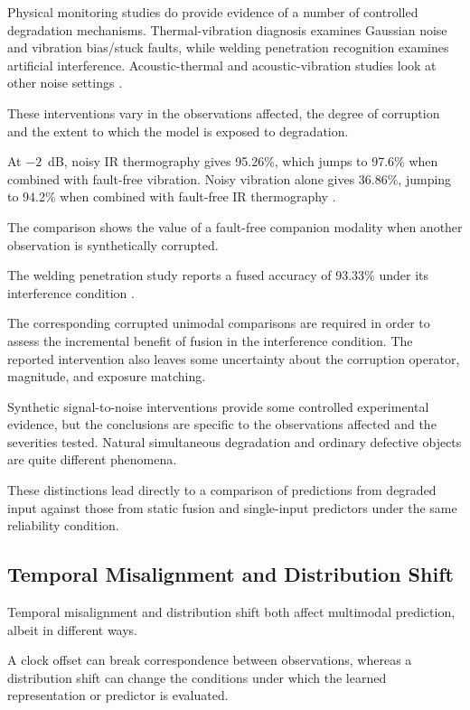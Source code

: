 Physical monitoring studies do provide evidence of a number of controlled degradation mechanisms.
Thermal-vibration diagnosis examines Gaussian noise and vibration bias/stuck faults, while welding
penetration recognition examines artificial interference. Acoustic-thermal and acoustic-vibration
studies look at other noise settings
\parencite{huo_multisensor_2022,hua_anti-interference_2026,ying_trustworthy_2025,huang_rolling_2026}.

These interventions vary in the observations affected, the degree of corruption and the extent to
which the model is exposed to degradation.

At $-2$~dB, noisy IR thermography gives 95.26\%, which jumps to 97.6\% when combined with fault-free
vibration. Noisy vibration alone gives 36.86\%, jumping to 94.2\% when combined with fault-free IR
thermography \parencite[Table~VIII]{huo_multisensor_2022}.

The comparison shows the value of a fault-free companion modality when another observation is
synthetically corrupted.

The welding penetration study reports a fused accuracy of 93.33\% under its interference condition
\parencite[Table~3]{hua_anti-interference_2026}.

The corresponding corrupted unimodal comparisons are required in order to assess the incremental
benefit of fusion in the interference condition. The reported intervention also leaves some
uncertainty about the corruption operator, magnitude, and exposure matching.

Synthetic signal-to-noise interventions provide some controlled experimental evidence, but the
conclusions are specific to the observations affected and the severities tested. Natural
simultaneous degradation and ordinary defective objects are quite different phenomena.

These distinctions lead directly to a comparison of predictions from degraded input against those
from static fusion and single-input predictors under the same reliability condition.

\subsection{Temporal Misalignment and Distribution Shift}

Temporal misalignment and distribution shift both affect multimodal prediction, albeit in different
ways.

A clock offset can break correspondence between observations, whereas a distribution shift can
change the conditions under which the learned representation or predictor is evaluated.

